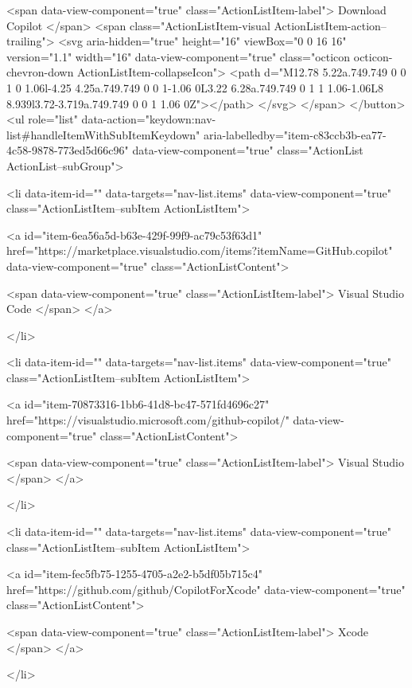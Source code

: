        <span data-view-component="true" class="ActionListItem-label">
          Download Copilot
</span>      
        <span class="ActionListItem-visual ActionListItem-action--trailing">
          <svg aria-hidden="true" height="16" viewBox="0 0 16 16" version="1.1" width="16" data-view-component="true" class="octicon octicon-chevron-down ActionListItem-collapseIcon">
    <path d="M12.78 5.22a.749.749 0 0 1 0 1.06l-4.25 4.25a.749.749 0 0 1-1.06 0L3.22 6.28a.749.749 0 1 1 1.06-1.06L8 8.939l3.72-3.719a.749.749 0 0 1 1.06 0Z"></path>
</svg>
        </span>
</button>
        <ul role="list" data-action="keydown:nav-list#handleItemWithSubItemKeydown" aria-labelledby="item-c83ccb3b-ea77-4c58-9878-773ed5d66c96" data-view-component="true" class="ActionList ActionList--subGroup">
          
<li data-item-id="" data-targets="nav-list.items" data-view-component="true" class="ActionListItem--subItem ActionListItem">
    
    
    <a id="item-6ea56a5d-b63e-429f-99f9-ac79c53f63d1" href="https://marketplace.visualstudio.com/items?itemName=GitHub.copilot" data-view-component="true" class="ActionListContent">
      
        <span data-view-component="true" class="ActionListItem-label">
          Visual Studio Code
</span>      
</a>
  
</li>

          
<li data-item-id="" data-targets="nav-list.items" data-view-component="true" class="ActionListItem--subItem ActionListItem">
    
    
    <a id="item-70873316-1bb6-41d8-bc47-571fd4696c27" href="https://visualstudio.microsoft.com/github-copilot/" data-view-component="true" class="ActionListContent">
      
        <span data-view-component="true" class="ActionListItem-label">
          Visual Studio
</span>      
</a>
  
</li>

          
<li data-item-id="" data-targets="nav-list.items" data-view-component="true" class="ActionListItem--subItem ActionListItem">
    
    
    <a id="item-fec5fb75-1255-4705-a2e2-b5df05b715c4" href="https://github.com/github/CopilotForXcode" data-view-component="true" class="ActionListContent">
      
        <span data-view-component="true" class="ActionListItem-label">
          Xcode
</span>      
</a>
  
</li>

